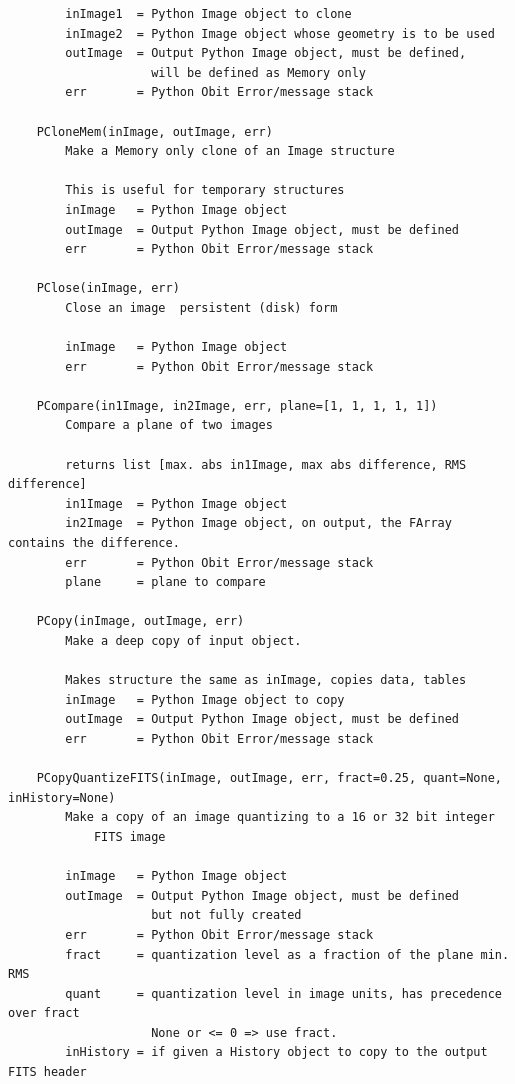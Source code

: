 \documentclass[11pt]{report}
\begin{document}
\begin{verbatim}
        inImage1  = Python Image object to clone
        inImage2  = Python Image object whose geometry is to be used
        outImage  = Output Python Image object, must be defined,
                    will be defined as Memory only
        err       = Python Obit Error/message stack
    
    PCloneMem(inImage, outImage, err)
        Make a Memory only clone of an Image structure
        
        This is useful for temporary structures
        inImage   = Python Image object
        outImage  = Output Python Image object, must be defined
        err       = Python Obit Error/message stack
    
    PClose(inImage, err)
        Close an image  persistent (disk) form
        
        inImage   = Python Image object
        err       = Python Obit Error/message stack
    
    PCompare(in1Image, in2Image, err, plane=[1, 1, 1, 1, 1])
        Compare a plane of two images
        
        returns list [max. abs in1Image, max abs difference, RMS difference]
        in1Image  = Python Image object
        in2Image  = Python Image object, on output, the FArray contains the difference.
        err       = Python Obit Error/message stack
        plane     = plane to compare
    
    PCopy(inImage, outImage, err)
        Make a deep copy of input object.
        
        Makes structure the same as inImage, copies data, tables
        inImage   = Python Image object to copy
        outImage  = Output Python Image object, must be defined
        err       = Python Obit Error/message stack
    
    PCopyQuantizeFITS(inImage, outImage, err, fract=0.25, quant=None, inHistory=None)
        Make a copy of an image quantizing to a 16 or 32 bit integer
            FITS image
        
        inImage   = Python Image object
        outImage  = Output Python Image object, must be defined
                    but not fully created
        err       = Python Obit Error/message stack
        fract     = quantization level as a fraction of the plane min. RMS
        quant     = quantization level in image units, has precedence over fract
                    None or <= 0 => use fract.
        inHistory = if given a History object to copy to the output FITS header
    

\end{verbatim}
\end{document}
